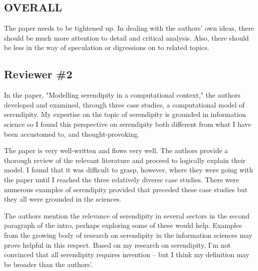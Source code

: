 {\subsection{OVERALL} \label{app:overall}

The paper needs to be tightened up.  In dealing with the authors' own ideas, there should be much more attention to detail and critical analysis. Also, there should be less in the way of speculation or digressions on to related topics.


\subsection{Reviewer \#2} \label{app:rev2}
In the paper, "Modelling serendipity in a computational context," the authors developed and examined, through three case studies, a computational model of serendipity. My expertise on the topic of serendipity is grounded in information science so I found this perspective on serendipity both different from what I have been accustomed to, and thought-provoking. 

The paper is very well-written and flows very well. The authors provide a thorough review of the relevant literature and proceed to logically explain their model. I found that it was difficult to grasp, however, where they were going with the paper until I reached the three relatively diverse case studies. There were numerous examples of serendipity provided that preceded these case studies but they all were grounded in the sciences. 

The authors mention the relevance of serendipity in several sectors in the second paragraph of the intro, perhaps exploring some of these would help. Examples from the growing body of research on serendipity in the information sciences may prove helpful in this respect. Based on my research on serendipity, I'm not convinced that all serendipity requires invention -- but I think my definition may be broader than the authors'.

}
